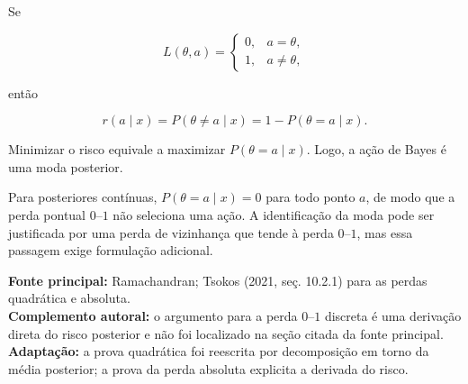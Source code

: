 \documentclass[
  letterpaper,
  DIV=11,
  numbers=noendperiod]{scrreprt}
\begin{document}
Se

\[
L(\theta,a)=
\begin{cases}
0,&a=\theta,\\
1,&a\neq\theta,
\end{cases}
\]

então

\[
r(a\mid x)
=P(\theta\neq a\mid x)
=1-P(\theta=a\mid x).
\]

Minimizar o risco equivale a maximizar \(P(\theta=a\mid x)\). Logo, a
ação de Bayes é uma moda posterior.

\begin{tcolorbox}[enhanced jigsaw, colback=white, leftrule=.75mm, colbacktitle=quarto-callout-warning-color!10!white, breakable, titlerule=0mm, bottomtitle=1mm, title=\textcolor{quarto-callout-warning-color}{\faExclamationTriangle}\hspace{0.5em}{Parâmetro contínuo e perda 0--1}, colframe=quarto-callout-warning-color-frame, toprule=.15mm, opacityback=0, bottomrule=.15mm, opacitybacktitle=0.6, arc=.35mm, toptitle=1mm, rightrule=.15mm, coltitle=black, left=2mm]

Para posteriores contínuas, \(P(\theta=a\mid x)=0\) para todo ponto
\(a\), de modo que a perda pontual \(0\)--\(1\) não seleciona uma ação.
A identificação da moda pode ser justificada por uma perda de vizinhança
que tende à perda \(0\)--\(1\), mas essa passagem exige formulação
adicional.

\end{tcolorbox}

\begin{tcolorbox}[enhanced jigsaw, colback=white, leftrule=.75mm, colbacktitle=quarto-callout-note-color!10!white, breakable, titlerule=0mm, bottomtitle=1mm, title=\textcolor{quarto-callout-note-color}{\faInfo}\hspace{0.5em}{Fonte da demonstração}, colframe=quarto-callout-note-color-frame, toprule=.15mm, opacityback=0, bottomrule=.15mm, opacitybacktitle=0.6, arc=.35mm, toptitle=1mm, rightrule=.15mm, coltitle=black, left=2mm]

\textbf{Fonte principal:} Ramachandran; Tsokos (2021, seç. 10.2.1) para
as perdas quadrática e absoluta.\\
\textbf{Complemento autoral:} o argumento para a perda \(0\)--\(1\)
discreta é uma derivação direta do risco posterior e não foi localizado
na seção citada da fonte principal.\\
\textbf{Adaptação:} a prova quadrática foi reescrita por decomposição em
torno da média posterior; a prova da perda absoluta explicita a derivada
do risco.

\end{tcolorbox}
\end{document}
